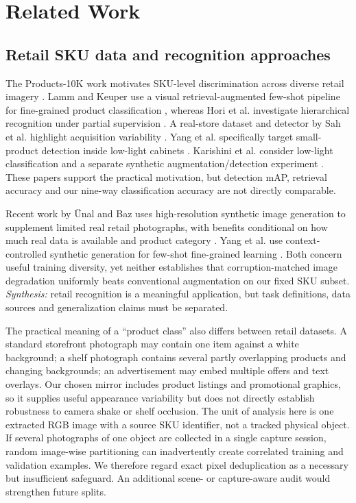 \documentclass[sigconf,nonacm]{acmart}
\begin{document}
\section{Related Work}
\subsection{Retail SKU data and recognition approaches}
The Products-10K work motivates SKU-level discrimination across diverse retail imagery \cite{bai2020products}. Lamm and Keuper use a visual retrieval-augmented few-shot pipeline for fine-grained product classification \cite{lamm2025rag}, whereas Hori et al. investigate hierarchical recognition under partial supervision \cite{hori2026hierarchical}. A real-store dataset and detector by Sah et al. highlight acquisition variability \cite{sah2026grocer}. Yang et al. specifically target small-product detection inside low-light cabinets \cite{yang2026retail}. Karishini et al. consider low-light classification and a separate synthetic augmentation/detection experiment \cite{karishini2026low}. These papers support the practical motivation, but detection mAP, retrieval accuracy and our nine-way classification accuracy are not directly comparable.

Recent work by \"Unal and Baz uses high-resolution synthetic image generation to supplement limited real retail photographs, with benefits conditional on how much real data is available and product category \cite{unal2026synthetic}. Yang et al. use context-controlled synthetic generation for few-shot fine-grained learning \cite{yang2026beyond}. Both concern useful training diversity, yet neither establishes that corruption-matched image degradation uniformly beats conventional augmentation on our fixed SKU subset. \emph{Synthesis:} retail recognition is a meaningful application, but task definitions, data sources and generalization claims must be separated.


The practical meaning of a ``product class'' also differs between retail datasets. A standard storefront photograph may contain one item against a white background; a shelf photograph contains several partly overlapping products and changing backgrounds; an advertisement may embed multiple offers and text overlays. Our chosen mirror includes product listings and promotional graphics, so it supplies useful appearance variability but does not directly establish robustness to camera shake or shelf occlusion. The unit of analysis here is one extracted RGB image with a source SKU identifier, not a tracked physical object. If several photographs of one object are collected in a single capture session, random image-wise partitioning can inadvertently create correlated training and validation examples. We therefore regard exact pixel deduplication as a necessary but insufficient safeguard. An additional scene- or capture-aware audit would strengthen future splits.
\end{document}
